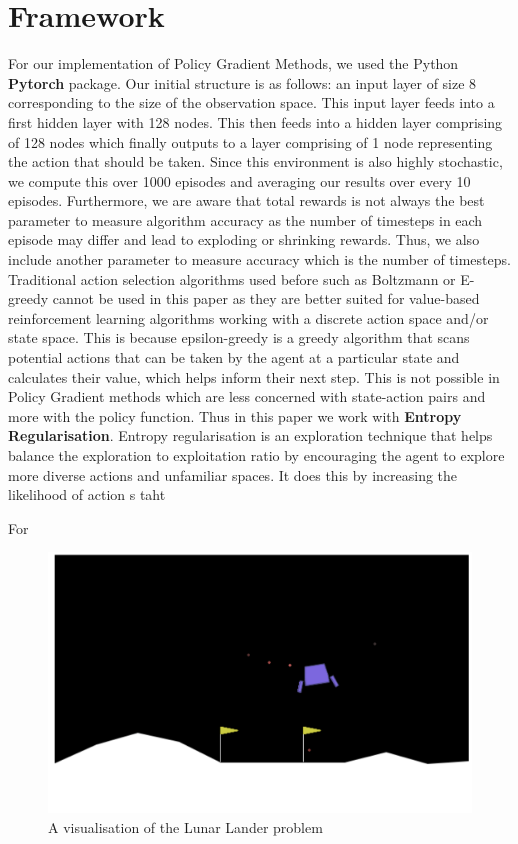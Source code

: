 \documentclass{article}
\begin{document}
\section{Framework}
For our implementation of Policy Gradient Methods, we used the Python \textbf{Pytorch} package. Our initial structure is as follows: an input layer of size 8 corresponding to the size of the observation space. This input layer feeds into a first hidden layer with 128 nodes. This then feeds into a hidden layer comprising of 128 nodes which finally outputs to a layer comprising of 1 node representing the action that should be taken. Since this environment is also highly stochastic, we compute this over 1000 episodes and averaging our results over every 10 episodes. Furthermore, we are aware that total rewards is not always the best parameter to measure algorithm accuracy as the number of timesteps in each episode may differ and lead to exploding or shrinking rewards. Thus, we also include another parameter to measure accuracy which is the number of timesteps. \newline
Traditional action selection algorithms used before such as Boltzmann or E-greedy cannot be used in this paper as they are better suited for value-based reinforcement learning algorithms working with a discrete action space and/or state space. This is because epsilon-greedy is a greedy algorithm that scans potential actions that can be taken by the agent at a particular state and calculates their value, which helps inform their next step. This is not possible in Policy Gradient methods which are less concerned with state-action pairs and more with the policy function. Thus in this paper we work with \textbf{Entropy Regularisation}. Entropy regularisation is an exploration technique that helps balance the exploration to exploitation ratio by encouraging the agent to explore more diverse actions and unfamiliar spaces. It does this by increasing the likelihood of action s taht  

For 

\begin{figure}[htbp]
\centering
\includegraphics[width=0.6\linewidth]{Report/images/visualisation.png}
\caption{\label{fig:Visualization of the Cart-pole} A visualisation of the Lunar Lander problem}
\end{figure}
\end{document}
